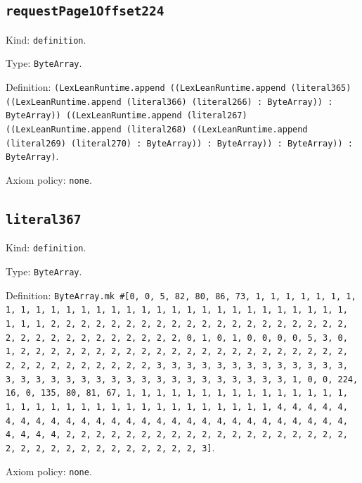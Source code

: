 \documentclass[11pt]{article}
\begin{document}
\subsection*{\texttt{requestPage1Offset224}}
\noindent Kind: \texttt{definition}.\par
\noindent Type: \texttt{ByteArray}.\par
\noindent Definition: \texttt{(LexLeanRuntime.append ((LexLeanRuntime.append (literal365) ((LexLeanRuntime.append (literal366) (literal266) : ByteArray)) : ByteArray)) ((LexLeanRuntime.append (literal267) ((LexLeanRuntime.append (literal268) ((LexLeanRuntime.append (literal269) (literal270) : ByteArray)) : ByteArray)) : ByteArray)) : ByteArray)}.\par
\noindent Axiom policy: \texttt{none}.\par
\subsection*{\texttt{literal367}}
\noindent Kind: \texttt{definition}.\par
\noindent Type: \texttt{ByteArray}.\par
\noindent Definition: \texttt{ByteArray.mk \#[0, 0, 5, 82, 80, 86, 73, 1, 1, 1, 1, 1, 1, 1, 1, 1, 1, 1, 1, 1, 1, 1, 1, 1, 1, 1, 1, 1, 1, 1, 1, 1, 1, 1, 1, 1, 1, 1, 1, 1, 2, 2, 2, 2, 2, 2, 2, 2, 2, 2, 2, 2, 2, 2, 2, 2, 2, 2, 2, 2, 2, 2, 2, 2, 2, 2, 2, 2, 2, 2, 2, 2, 0, 1, 0, 1, 0, 0, 0, 0, 5, 3, 0, 1, 2, 2, 2, 2, 2, 2, 2, 2, 2, 2, 2, 2, 2, 2, 2, 2, 2, 2, 2, 2, 2, 2, 2, 2, 2, 2, 2, 2, 2, 2, 2, 2, 3, 3, 3, 3, 3, 3, 3, 3, 3, 3, 3, 3, 3, 3, 3, 3, 3, 3, 3, 3, 3, 3, 3, 3, 3, 3, 3, 3, 3, 3, 3, 3, 1, 0, 0, 224, 16, 0, 135, 80, 81, 67, 1, 1, 1, 1, 1, 1, 1, 1, 1, 1, 1, 1, 1, 1, 1, 1, 1, 1, 1, 1, 1, 1, 1, 1, 1, 1, 1, 1, 1, 1, 1, 1, 1, 4, 4, 4, 4, 4, 4, 4, 4, 4, 4, 4, 4, 4, 4, 4, 4, 4, 4, 4, 4, 4, 4, 4, 4, 4, 4, 4, 4, 4, 4, 4, 4, 2, 2, 2, 2, 2, 2, 2, 2, 2, 2, 2, 2, 2, 2, 2, 2, 2, 2, 2, 2, 2, 2, 2, 2, 2, 2, 2, 2, 2, 2, 2, 2, 3]}.\par
\noindent Axiom policy: \texttt{none}.\par
\end{document}
